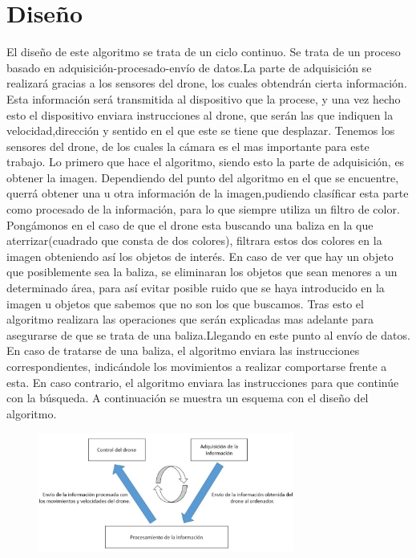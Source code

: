 \section{Diseño}
\hspace{1cm} El diseño de este algoritmo se trata de un ciclo continuo. Se trata de un proceso basado en adquisici\'on-procesado-env\'io de datos.La parte de adquisici\'on se realizar\'a gracias a los sensores del drone, los cuales obtendr\'an cierta informaci\'on. Esta informaci\'on ser\'a transmitida al dispositivo que la procese, y una vez hecho esto el dispositivo enviara instrucciones al drone, que ser\'an las que indiquen la velocidad,direcci\'on y sentido en el que este se tiene que desplazar.  Tenemos los sensores del drone, de los cuales la c\'amara es el mas importante para este trabajo. Lo primero que hace el algoritmo, siendo esto la parte de adquisici\'on, es obtener la imagen. Dependiendo del punto del algoritmo en el que se encuentre, querr\'a obtener una u otra informaci\'on de la imagen,pudiendo clas\'ificar esta parte como procesado de la informaci\'on, para lo que siempre utiliza un filtro de color. Pong\'amonos en el caso de que el drone esta buscando una baliza en la que aterrizar(cuadrado que consta de dos colores), filtrara estos dos colores en la imagen obteniendo as\'i los objetos de inter\'es. En caso de ver que hay un objeto que posiblemente sea la baliza, se eliminaran los objetos que sean menores a un determinado \'area, para as\'i evitar posible ruido que se haya introducido en la imagen u objetos que sabemos que no son los que buscamos. Tras esto el algoritmo realizara las operaciones que ser\'an explicadas mas adelante para asegurarse de que se trata de una baliza.Llegando en este punto al env\'io de datos. En caso de tratarse de una baliza, el algoritmo enviara las instrucciones correspondientes, indic\'andole los movimientos a realizar comportarse frente a esta. En caso contrario, el algoritmo enviara las instrucciones para que contin\'ue con la b\'usqueda. A continuación se muestra un esquema con el diseño del algoritmo. 

\begin{figure}[H]
	\centering
		\includegraphics[width=0.75\textwidth]{imgs/esquema_d.jpg}
	\label{fig:esquema_d}
\end{figure}


